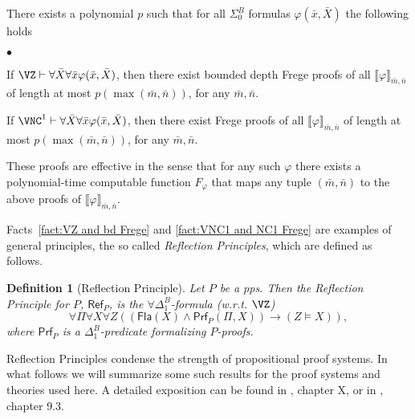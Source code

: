 \documentclass{LMCS}
\newtheorem{definition}{Definition}[section]
\begin{document}
\begin{fact}
  \label{fact:polynomial simulation}
  There exists a polynomial $p$ such that for all $\Sigma^B_0$ formulas $\varphi(\bar x,\bar X)$ the
  following holds
  \begin{iteMize}{$\bullet$}
    \item If $\VZ\vdash\forall\bar X\forall \bar x\varphi(\bar x,\bar X)$, then there exist bounded depth Frege
    proofs of all $\llbracket\varphi\rrbracket_{\bar m,\bar n}$ of length at most $p(\max(\bar m,\bar n))$, for
    any $\bar m,\bar n$.
    \item If $\VNC^1\vdash\forall\bar X\forall \bar x\varphi(\bar x,\bar X)$, then there exist Frege
    proofs of all $\llbracket\varphi\rrbracket_{\bar m,\bar n}$ of length at most $p(\max(\bar m,\bar n))$, for
    any $\bar m,\bar n$.
  \end{iteMize}
  These proofs are effective in the sense that for any such $\varphi$ there exists a polynomial-time computable
  function $F_\varphi$ that maps any tuple $(\bar m,\bar n)$ to the above proofs of $\llbracket\varphi\rrbracket_{\bar m,\bar
  n}$.
\end{fact}

Facts~\ref{fact:VZ and bd Frege} and \ref{fact:VNC1 and NC1 Frege} are examples of general principles, the so
called {\em Reflection Principles}, which are defined as follows.

\begin{definition}
  [Reflection Principle] Let $P$ be a pps. Then the {\em Reflection Principle}
  for $P$, $\mathsf{Ref}_P$, is the $\forall\Delta^B_1$-formula (w.r.t. $\VZ$) $$\forall\Pi\forall
  X\forall Z ((\mathsf{Fla}(X)\land
  \mathsf{Prf}_P(\Pi,X))\rightarrow (Z\vDash X)),$$ where $\mathsf{Prf}_P$ is a $\Delta^B_1$-predicate formalizing
  $P$-proofs.
\end{definition}

Reflection Principles condense the strength of propositional proof systems. In what follows we will summarize
some such results for the proof systems and theories used here. A detailed exposition can be found in
\cite{CN10}, chapter X, or in \cite{Kra95}, chapter 9.3.
\end{document}
